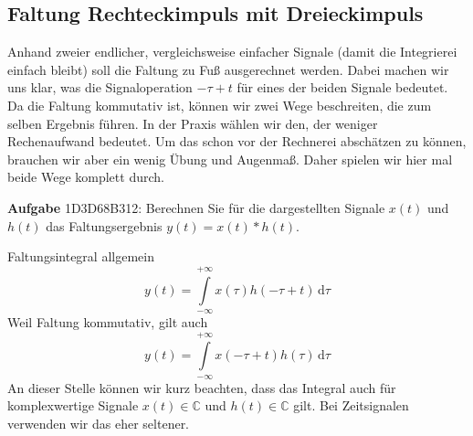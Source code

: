 \documentclass[11pt,a4paper,DIV=12]{scrartcl}
\numberwithin{equation}{section}
\numberwithin{figure}{section}
\newcommand\fsd{\mathrm{d}} %
\begin{document}
\newpage
\subsection{Faltung Rechteckimpuls mit Dreieckimpuls}
\label{sec:1D3D68B312}
\begin{Ziel}
Anhand zweier endlicher, vergleichsweise einfacher Signale (damit die Integrierei
einfach bleibt) soll die Faltung zu Fuß ausgerechnet werden.
Dabei machen wir uns klar, was die Signaloperation $-\tau+t$ für eines der beiden
Signale bedeutet.
Da die Faltung kommutativ ist, können wir zwei Wege beschreiten, die zum selben
Ergebnis führen. In der Praxis wählen wir den, der weniger Rechenaufwand bedeutet.
Um das schon vor der Rechnerei abschätzen zu können, brauchen wir aber ein wenig
Übung und Augenmaß. Daher spielen wir hier mal beide Wege komplett durch.
\end{Ziel}
%
\textbf{Aufgabe} {\tiny 1D3D68B312}: Berechnen Sie für die dargestellten Signale
$x(t)$ und $h(t)$ das Faltungsergebnis $y(t) = x(t) \ast h(t)$.
%
\begin{center}
\end{center}

\begin{Werkzeug}
Faltungsintegral allgemein
\begin{equation}
y(t) = \int\limits_{-\infty}^{+\infty} x(\tau) h(-\tau + t) \, \fsd \tau
\end{equation}
Weil Faltung kommutativ, gilt auch
\begin{equation}
y(t) = \int\limits_{-\infty}^{+\infty} x(-\tau+t) h(\tau) \, \fsd \tau
\end{equation}
An dieser Stelle können wir kurz beachten, dass das Integral auch für
komplexwertige Signale $x(t)\in\mathbb{C}$ und $h(t)\in\mathbb{C}$ gilt. Bei
Zeitsignalen verwenden wir das eher seltener.
\end{Werkzeug}
\end{document}
